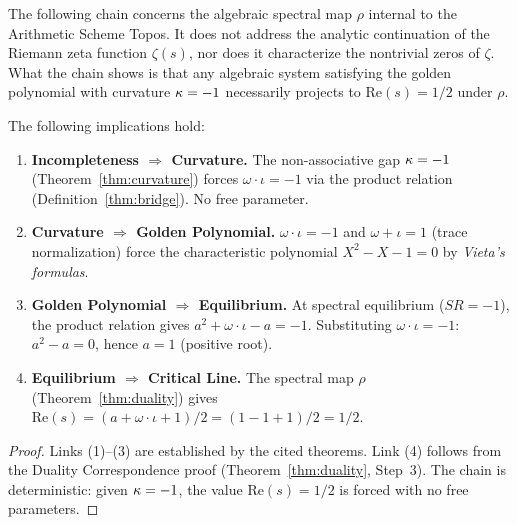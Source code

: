 \begin{remark}
The following chain concerns the algebraic spectral map $\rho$ internal to the Arithmetic Scheme Topos. It does not address the analytic continuation of the Riemann zeta function $\zeta(s)$, nor does it characterize the nontrivial zeros of $\zeta$. What the chain shows is that any algebraic system satisfying the golden polynomial with curvature $\kappa = -1$ necessarily projects to $\mathrm{Re}(s) = 1/2$ under $\rho$.
\end{remark}

\begin{theorem}\label{thm:spectral-chain}
The following implications hold:
\begin{enumerate}
\item \textbf{Incompleteness $\Rightarrow$ Curvature.} The non-associative gap $\kappa = -1$ (Theorem~\ref{thm:curvature}) forces $\omega \cdot \iota = -1$ via the product relation (Definition~\ref{thm:bridge}). No free parameter.
\item \textbf{Curvature $\Rightarrow$ Golden Polynomial.} $\omega \cdot \iota = -1$ and $\omega + \iota = 1$ (trace normalization) force the characteristic polynomial $X^2 - X - 1 = 0$ by \emph{Vieta's formulas}.
\item \textbf{Golden Polynomial $\Rightarrow$ Equilibrium.} At spectral equilibrium ($SR = -1$), the product relation gives $a^2 + \omega \cdot \iota - a = -1$. Substituting $\omega \cdot \iota = -1$: $a^2 - a = 0$, hence $a = 1$ (positive root).
\item \textbf{Equilibrium $\Rightarrow$ Critical Line.} The spectral map $\rho$ (Theorem~\ref{thm:duality}) gives $\mathrm{Re}(s) = (a + \omega \cdot \iota + 1)/2 = (1 - 1 + 1)/2 = 1/2$.
\end{enumerate}
\end{theorem}

\begin{proof}
Links (1)--(3) are established by the cited theorems. Link (4) follows from the Duality Correspondence proof (Theorem~\ref{thm:duality}, Step~3). The chain is deterministic: given $\kappa = -1$, the value $\mathrm{Re}(s) = 1/2$ is forced with no free parameters. \qedhere
\end{proof}



